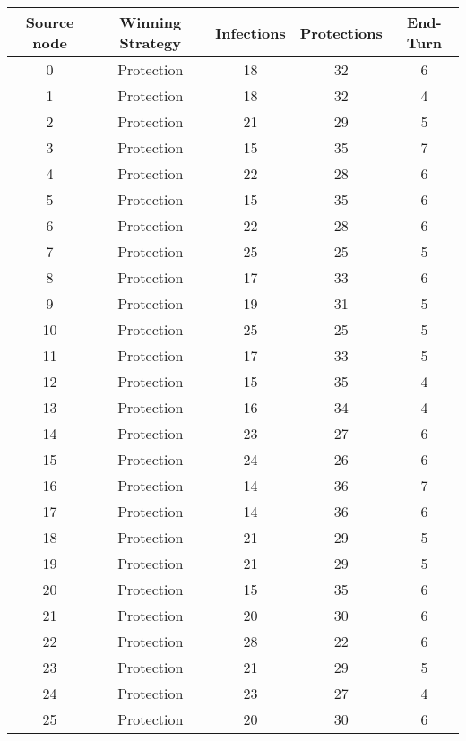 \documentclass[results.tex]{subfiles}
\begin{document}
\begin{center}
  \begin{tabular}{| c || c | c | c | c |}
    \hline
    {\bfseries Source node} & {\bfseries Winning Strategy} & {\bfseries Infections} & {\bfseries Protections} & {\bfseries End-Turn} \\  %
    \hline\hline
    0 & Protection & 18 & 32 & 6 \\ 
    \hline
    1 & Protection & 18 & 32 & 4 \\ 
    \hline
    2 & Protection & 21 & 29 & 5 \\ 
    \hline
    3 & Protection & 15 & 35 & 7 \\ 
    \hline
    4 & Protection & 22 & 28 & 6 \\ 
    \hline
    5 & Protection & 15 & 35 & 6 \\ 
    \hline
    6 & Protection & 22 & 28 & 6 \\ 
    \hline
    7 & Protection & 25 & 25 & 5 \\ 
    \hline
    8 & Protection & 17 & 33 & 6 \\ 
    \hline
    9 & Protection & 19 & 31 & 5 \\ 
    \hline
    10 & Protection & 25 & 25 & 5 \\ 
    \hline
    11 & Protection & 17 & 33 & 5 \\ 
    \hline
    12 & Protection & 15 & 35 & 4 \\ 
    \hline
    13 & Protection & 16 & 34 & 4 \\ 
    \hline
    14 & Protection & 23 & 27 & 6 \\ 
    \hline
    15 & Protection & 24 & 26 & 6 \\ 
    \hline
    16 & Protection & 14 & 36 & 7 \\ 
    \hline
    17 & Protection & 14 & 36 & 6 \\ 
    \hline
    18 & Protection & 21 & 29 & 5 \\ 
    \hline
    19 & Protection & 21 & 29 & 5 \\ 
    \hline
    20 & Protection & 15 & 35 & 6 \\ 
    \hline
    21 & Protection & 20 & 30 & 6 \\ 
    \hline
    22 & Protection & 28 & 22 & 6 \\ 
    \hline
    23 & Protection & 21 & 29 & 5 \\ 
    \hline
    24 & Protection & 23 & 27 & 4 \\ 
    \hline
    25 & Protection & 20 & 30 & 6 \\ 

\end{tabular}
\end{center}
\end{document}
